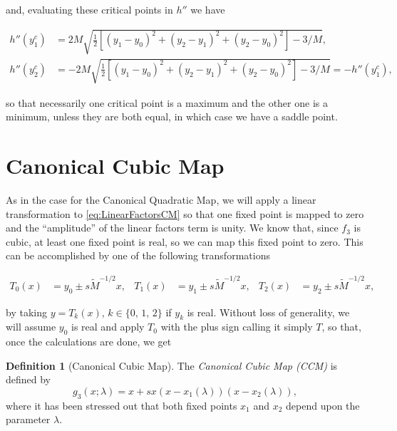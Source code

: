 \documentclass[10pt,twoside,titlepage]{book}
\numberwithin{equation}{chapter}
\numberwithin{figure}{chapter}
\numberwithin{table}{chapter}
\theoremstyle{plain}%
\theoremstyle{definition}
\newtheorem{defn}{Definition}[chapter]
\theoremstyle{remark}
\begin{document}
and, evaluating these critical points in $h''$ we have

\begin{equation}
	\begin{aligned}
		h''(y_1^c) &= 2M\sqrt{\frac{1}{2}\left[(y_1-y_0)^2+(y_2-y_1)^2+(y_2-y_0)^2\right]-3/M},\\
		h''(y_2^c) &= -2M\sqrt{\frac{1}{2}\left[(y_1-y_0)^2+(y_2-y_1)^2+(y_2-y_0)^2\right]-3/M}= -h''(y_1^c),
	\end{aligned}
\end{equation}

so that necessarily one critical point is a maximum and the other one is a minimum, unless they are both equal, in which case we have a saddle point.

\section{Canonical Cubic Map}
\label{sec:CanonicalCubicMap}

As in the case for the Canonical Quadratic Map, we will apply a linear transformation to \eqref{eq:LinearFactorsCM} so that one fixed point is mapped to zero and the ``amplitude'' of the linear factors term is unity. We know that, since $f_3$ is cubic, at least one fixed point is real, so we can map this fixed point to zero. This can be accomplished by one of the following transformations

\begin{equation}
	\begin{aligned}
		T_0(x)&=y_0\pm s\tilde{M}^{-1/2}x, & T_1(x)&=y_1\pm s\tilde{M}^{-1/2}x, & T_2(x)&=y_2\pm s\tilde{M}^{-1/2}x,
	\end{aligned}
\end{equation}

by taking $y=T_k(x),\,k\in\{0,\,1,\,2\}$ if $y_k$ is real. Without loss of generality, we will assume $y_0$ is real and apply $T_0$ with the plus sign calling it simply $T$, so that, once the calculations are done, we get

\begin{defn}[Canonical Cubic Map]
	\label{def:CCM}
	The \emph{Canonical Cubic Map (CCM)} is defined by
	\begin{equation}
		g_3(x;\lambda)=x+sx(x-x_1(\lambda))(x-x_2(\lambda)),
		\label{eq:CanonicalCubicMap}
	\end{equation}
	where it has been stressed out that both fixed points $x_1$ and $x_2$ depend upon the parameter $\lambda$.
\end{defn}
\end{document}
